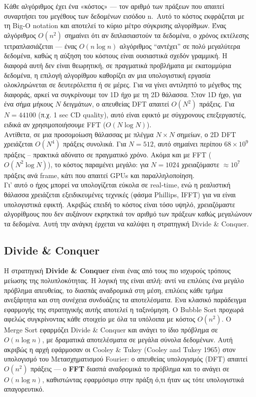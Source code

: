\documentclass[a4paper, 11pt]{article}
\begin{document}
Κάθε αλγόριθμος έχει ένα «κόστος» --- τον αριθμό των πράξεων που απαιτεί
συναρτήσει του μεγέθους των δεδομένων εισόδου n.~Αυτό το κόστος
εκφράζεται με τη Big-O notation και αποτελεί το κύριο μέτρο σύγκρισης
αλγορίθμων. Ένας αλγόριθμος \(O(n^2)\) σημαίνει ότι αν διπλασιαστούν τα
δεδομένα, ο χρόνος εκτέλεσης τετραπλασιάζεται --- ένας \(O(n \log n)\)
αλγόριθμος ``αντέχει'' σε πολύ μεγαλύτερα δεδομένα, καθώς η αύξηση του
κόστους είναι ουσιαστικά σχεδόν γραμμική. Η διαφορά αυτή δεν είναι
θεωρητική, σε πραγματικά προβλήματα με εκατομμύρια δεδομένα, η επιλογή
αλγορίθμου καθορίζει αν μια υπολογιστική εργασία ολοκληρώνεται σε
δευτερόλεπτα ή σε μέρες. Για να γίνει αντιληπτό το μέγεθος της διαφοράς,
αρκεί να συγκρίνουμε τον 1D ήχο με τη 2D θάλασσα. Στον 1D ήχο, για ένα
σήμα μήκους \(N\) δειγμάτων, ο απευθείας DFT απαιτεί \(O(N^2)\) πράξεις.
Για \(N=44100\) (π.χ. 1 sec CD quality), αυτό είναι εφικτό με σύγχρονους
επεξεργαστές, ειδικά αν χρησιμοποιήσουμε FFT (\(O(N \log N)\)).\\
Αντίθετα, σε μια προσομοίωση θάλασσας με πλέγμα \(N \times N\) σημείων,
ο 2D DFT χρειάζεται \(O(N^4)\) πράξεις συνολικά. Για \(N=512\), αυτό
σημαίνει περίπου \(68 \times 10^9\) πράξεις -- πρακτικά αδύνατο σε
πραγματικό χρόνο. Ακόμα και με FFT (\(O(N^2 \log N)\)), το κόστος
παραμένει μεγάλο: για \(N=1024\) χρειαζόμαστε \(\approx 10^7\) πράξεις
ανά frame, κάτι που απαιτεί GPUs και παραλληλοποίηση.\\
Γι' αυτό ο ήχος μπορεί να υπολογίζεται εύκολα σε real‑time, ενώ η
ρεαλιστική θάλασσα χρειάζεται εξειδικευμένες τεχνικές (φάσμα Phillips,
IFFT) για να είναι υπολογιστικά εφικτή. Ακριβώς επειδή το κόστος είναι
τόσο υψηλό, χρειαζόμαστε αλγορίθμους που δεν αυξάνουν εκρηκτικά τον
αριθμό των πράξεων καθώς μεγαλώνουν τα δεδομένα. Αυτή την ανάγκη έρχεται
να καλύψει η στρατηγική Divide \& Conquer.

\subsection{Divide \& Conquer}\label{divide-conquer}

Η στρατηγική \textbf{Divide \& Conquer} είναι ένας από τους πιο ισχυρούς
τρόπους μείωσης της πολυπλοκότητας. Η λογική της είναι απλή: αντί να
επιλύεις ένα μεγάλο πρόβλημα απευθείας, το διασπάς αναδρομικά στη μέση,
επιλύεις κάθε τμήμα ανεξάρτητα και στη συνέχεια συνδυάζεις τα
αποτελέσματα. Ενα κλασικό παράδειγμα εφαρμογής της στρατηγικής αυτής
αποτελεί η ταξινόμηση. Ο Bubble Sort προχωρά αφελώς συγκρίνοντας κάθε
στοιχείο με όλα τα υπόλοιπα με κόστος \(O(n^2)\). Ο Merge Sort εφαρμόζει
Divide \& Conquer και ανάγει το ίδιο πρόβλημα σε \(O(n \log n)\), με
δραματικά αποτελέσματα σε μεγάλα σύνολα δεδομένων. Αυτή ακριβώς η αρχή
εφάρμοσαν οι Cooley \& Tukey (Cooley and Tukey 1965) στον υπολογισμό του
Μετασχηματισμού Fourier: ο απευθείας υπολογισμός (DFT) απαιτεί
\(O(n^2)\) πράξεις --- ο \textbf{FFT} διασπά αναδρομικά το πρόβλημα και
το ανάγει σε \(O(n \log n)\), καθιστώντας εφαρμόσιμο στην πράξη ό,τι
ήταν ως τότε υπολογιστικά απαγορευτικό.
\end{document}
